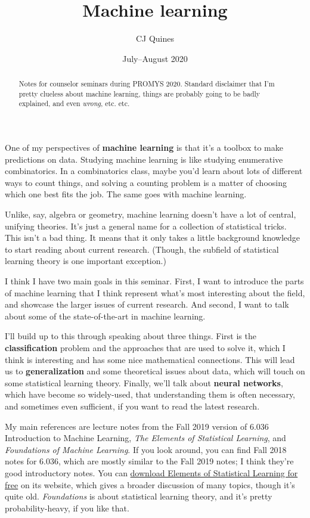 \documentclass[11pt,paper=letter]{scrartcl}
\begin{document}
\title{Machine learning}
\author{CJ Quines}
\date{July--August 2020}

\maketitle

\begin{abstract}
Notes for counselor seminars during PROMYS 2020. Standard disclaimer that I'm pretty clueless about machine learning, things are probably going to be badly explained, and even \textit{wrong}, etc. etc.
\end{abstract}

One of my perspectives of \textbf{machine learning} is that it's a toolbox to make predictions on data. Studying machine learning is like studying enumerative combinatorics. In a combinatorics class, maybe you'd learn about lots of different ways to count things, and solving a counting problem is a matter of choosing which one best fits the job. The same goes with machine learning.

Unlike, say, algebra or geometry, machine learning doesn't have a lot of central, unifying theories. It's just a general name for a collection of statistical tricks. This isn't a bad thing. It means that it only takes a little background knowledge to start reading about current research. (Though, the subfield of statistical learning theory is one important exception.)

I think I have two main goals in this seminar. First, I want to introduce the parts of machine learning that I think represent what's most interesting about the field, and showcase the larger issues of current research. And second, I want to talk about some of the state-of-the-art in machine learning.

I'll build up to this through speaking about three things. First is the \textbf{classification} problem and the approaches that are used to solve it, which I think is interesting and has some nice mathematical connections. This will lead us to \textbf{generalization} and some theoretical issues about data, which will touch on some statistical learning theory. Finally, we'll talk about \textbf{neural networks}, which have become so widely-used, that understanding them is often necessary, and sometimes even sufficient, if you want to read the latest research.

My main references are lecture notes from the Fall 2019 version of 6.036 Introduction to Machine Learning, \textit{The Elements of Statistical Learning}, and \textit{Foundations of Machine Learning}. If you look around, you can find Fall 2018 notes for 6.036, which are mostly similar to the Fall 2019 notes; I think they're good introductory notes. You can \href{https://web.stanford.edu/~hastie/ElemStatLearn//}{download Elements of Statistical Learning for free} on its website, which gives a broader discussion of many topics, though it's quite old. \textit{Foundations} is about statistical learning theory, and it's pretty probability-heavy, if you like that.
\end{document}
